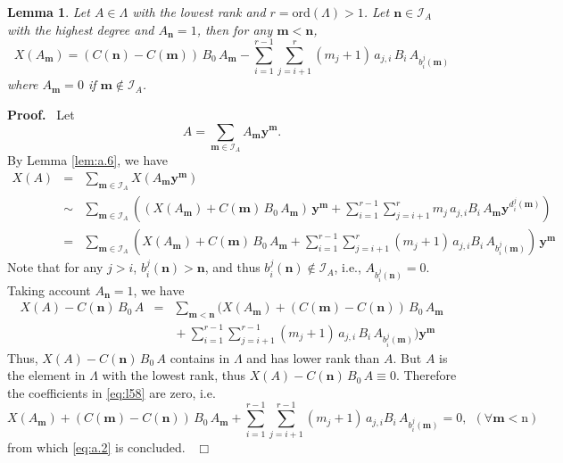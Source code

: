\documentclass[preprint, 12pt]{elsarticle}
\newtheorem{lem}[thm]{Lemma}
\numberwithin{equation}{section}
\newenvironment{proof}[1][Proof]{\textbf{#1.}\ }{\ $\Box$}
\begin{document}
\begin{lem}
\label{lem:a.9} Let $A\in \Lambda$ with the lowest rank and $r =
\mathrm{ord}(\Lambda) > 1$. Let $\mathbf{n}\in \mathcal{I}_A$ with the
highest degree and $A_\mathbf{n} = 1$, then for any $\mathbf{m} <
\mathbf{n}$,
\begin{equation}
\label{eq:a.2} X(A_\mathbf{m}) = (C({\mathbf{n}}) -
C({\mathbf{m}}))\,B_0\,A_{\mathbf{m}}
-\sum_{i=1}^{r-1}\sum_{j=i+1}^{r}(m_j+1)\,a_{j,i}\,B_i\,A_{{b_i^j}(\mathbf{m})}
\end{equation}
where $A_{\mathbf{m}} = 0$ if $\mathbf{m}\not\in \mathcal{I}_A$.
\end{lem}
\begin{proof}
Let
$$A = \sum_{\mathbf{m}\in \mathcal{I}_A}A_{\mathbf{m}}\mathbf{y}^{\mathbf{m}}.$$
By Lemma \ref{lem:a.6}, we have
\begin{eqnarray*}
X(A)&=&\sum_{\mathbf{m}\in \mathcal{I}_A}X(A_{\mathbf{m}}\mathbf{y}^{\mathbf{m}})\\
&\sim&\sum_{\mathbf{m}\in \mathcal{I}_A}\left((X(A_{\mathbf{m}}) +
C({\mathbf{m}})\,B_0\,A_{\mathbf{m}})\,\mathbf{y}^{\mathbf{m}}  +
\sum_{i=1}^{r-1}\sum_{j =
i+1}^{r}m_j\,a_{j,i}B_i\,A_{\mathbf{m}}\mathbf{y}^{d_{i}^j(\mathbf{m})}\right)\\
&=&\sum_{\mathbf{m}\in \mathcal{I}_A}\left(X(A_{\mathbf{m}}) +
C({\mathbf{m}})\,B_0\,A_{\mathbf{m}} + \sum_{i=1}^{r-1}\sum_{j =
i+1}^{r}(m_j+1)\,a_{j,i}B_i\,A_{{b_i^j}(\mathbf{m})}\right)\,\mathbf{y}^{\mathbf{m}}
\end{eqnarray*}
Note that for any $j>i$, $b_i^j(\mathbf{n}) > \mathbf{n}$,  and
thus $b_i^j(\mathbf{n}) \not\in \mathcal{I}_A$, i.e., $A_{b_i^j(\mathbf{n})}
= 0$. Taking account $A_{\mathbf{n}} = 1$, we have
\begin{eqnarray}
\label{eq:l58}
X(A) - C({\mathbf{n}})\,B_0\,A  &=& \sum_{\mathbf{m} < \mathbf{n}}\Big(X(A_\mathbf{m})
+ (C({\mathbf{m}}) - C({\mathbf{n}}))\,B_0\,A_{\mathbf{m}}\nonumber\\
&&{} +
\sum_{i=1}^{r-1}\sum_{j=i+1}^{r-1}(m_j+1)\,a_{j,i}\,B_i\,A_{{b_i^j}(\mathbf{m})}\Big)\mathbf{y}^{\mathbf{m}}
\end{eqnarray}
Thus, $X(A) - C({\mathbf{n}})\,B_0\,A$ contains in
$\Lambda$ and has lower rank than $A$. But $A$ is the element in
$\Lambda$ with the lowest rank, thus  
$X(A)- C({\mathbf{n}})\,B_0\,A\equiv0$. Therefore the coefficients in \eqref{eq:l58} are zero, i.e.
$$X(A_{\mathbf{m}}) +
(C({\mathbf{m}}) - C(\mathbf{n}))\,B_0\,A_{\mathbf{m}} + \sum_{i=1}^{r-1}\sum_{j =
i+1}^{r-1}(m_j+1)\,a_{j,i}B_i\,A_{{b_i^j}(\mathbf{m})} = 0,\ \ (\forall \mathbf{m}<\mathrm{n})$$
from which \eqref{eq:a.2} is concluded.
\end{proof}
\end{document}
